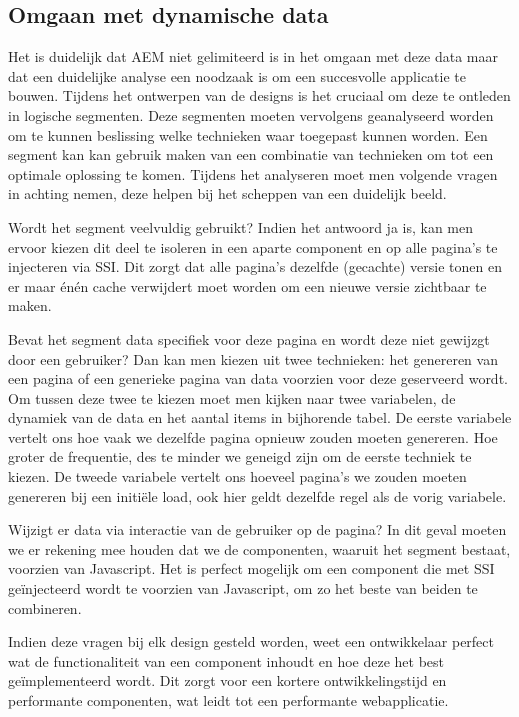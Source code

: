 \documentclass{article}
\begin{document}
    \subsection{Omgaan met dynamische data}
    Het is duidelijk dat AEM niet gelimiteerd is in het omgaan met deze data maar dat een duidelijke analyse een noodzaak is om een succesvolle applicatie te bouwen. Tijdens het ontwerpen van de designs is het cruciaal om deze te ontleden in logische segmenten. Deze segmenten moeten vervolgens geanalyseerd worden om te kunnen beslissing welke technieken waar toegepast kunnen worden. Een segment kan kan gebruik maken van een combinatie van technieken om tot een optimale oplossing te komen. Tijdens het analyseren moet men volgende vragen in achting nemen, deze helpen bij het scheppen van een duidelijk beeld.
    \par
    Wordt het segment veelvuldig gebruikt? Indien het antwoord ja is, kan men ervoor kiezen dit deel te isoleren in een aparte component en op alle pagina's te injecteren via SSI. Dit zorgt dat alle pagina's dezelfde (gecachte) versie tonen en er maar \'en\'en cache verwijdert moet worden om een nieuwe versie zichtbaar te maken.
    \par
    Bevat het segment data specifiek voor deze pagina en wordt deze niet gewijzgt door een gebruiker? Dan kan men kiezen uit twee technieken: het genereren van een pagina of een generieke pagina van data voorzien voor deze geserveerd wordt. Om tussen deze twee te kiezen moet men kijken naar twee variabelen, de dynamiek van de data en het aantal items in bijhorende tabel. De eerste variabele vertelt ons hoe vaak we dezelfde pagina opnieuw zouden moeten genereren. Hoe groter de frequentie, des te minder we geneigd zijn om de eerste techniek te kiezen. De tweede variabele vertelt ons hoeveel pagina's we zouden moeten genereren bij een initi\"ele load, ook hier geldt dezelfde regel als de vorig variabele.
    \par
	Wijzigt er data via interactie van de gebruiker op de pagina? In dit geval moeten we er rekening mee houden dat we de componenten, waaruit het segment bestaat, voorzien van Javascript. Het is perfect mogelijk om een component die met SSI ge\"injecteerd wordt te voorzien van Javascript, om zo het beste van beiden te combineren.
	\par
	Indien deze vragen bij elk design gesteld worden, weet een ontwikkelaar perfect wat de functionaliteit van een component inhoudt en hoe deze het best ge\"implementeerd wordt. Dit zorgt voor een kortere ontwikkelingstijd en performante componenten, wat leidt tot een performante webapplicatie.      
\end{document}

